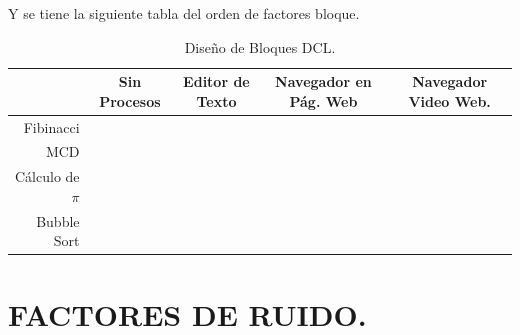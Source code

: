 \documentclass[11pt,a4paper]{article}
\begin{document}
Y se tiene la siguiente tabla del orden de factores bloque.
\begin{table}[hbt!]
	\centering
	\footnotesize 
	\begin{tabular}{r|*{4}{c}}
		& Sin Procesos &	Editor de Texto &	Navegador en Pág. Web & Navegador Video Web. \\ \hline
		Fibinacci &  &   &   & \\
		MCD &  &   &  &  \\
		Cálculo de \(\pi\) &  &  &   &  \\
		Bubble Sort & &   &   & 
	\end{tabular}
	\caption{Diseño de Bloques DCL.} 
	\label{tab:diseño_dcl_exp}
\end{table}

\section{FACTORES DE RUIDO.} %
\label{sec:factores_ruido}
\end{document}
